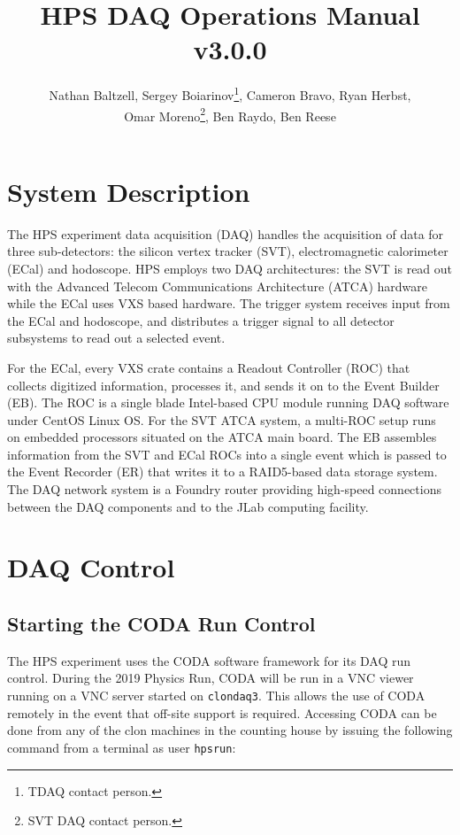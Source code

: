 \documentclass[12pt]{article}
\title{HPS DAQ Operations Manual v3.0.0}
\author{Nathan Baltzell, Sergey Boiarinov\thanks{TDAQ contact person.},
        Cameron Bravo, Ryan Herbst, \\ Omar Moreno\thanks{SVT DAQ contact person.}, 
        Ben Raydo, Ben Reese}
\begin{document}
\maketitle

\tableofcontents

\newpage
\section{System Description}
The HPS experiment data acquisition (DAQ) handles the acquisition of data for
three sub-detectors: the silicon vertex tracker (SVT), electromagnetic calorimeter
(ECal) and hodoscope. HPS employs two DAQ architectures: the SVT is read out 
with the Advanced Telecom Communications Architecture (ATCA) hardware while the
ECal uses VXS based hardware. The trigger system receives input from the ECal
and hodoscope, and distributes a trigger signal to all detector subsystems to
read out a selected event. 

For the ECal, every VXS crate contains a Readout Controller (ROC) that collects digitized information, processes it, and sends it on to the Event Builder (EB). The ROC is a single blade Intel-based CPU module running DAQ software under CentOS Linux OS. For the SVT ATCA system, a multi-ROC setup runs on embedded processors situated on the ATCA main board. The EB assembles information from the SVT and ECal ROCs into a single event which is passed to the Event Recorder (ER) that writes it to a RAID5-based data storage system. The DAQ network system is a Foundry router providing high-speed connections between the DAQ components and to the JLab computing facility. 

\newpage
\section{DAQ Control}
\label{sec:daq_control}

\subsection{Starting the CODA Run Control}\label{sec:daqstart}

The HPS experiment uses the CODA software framework for its DAQ run control. 
During the 2019 Physics Run, CODA will be run in a VNC viewer running on a 
VNC server started on \texttt{clondaq3}.  This allows the use of CODA remotely
in the event that off-site support is required.  Accessing CODA can be done 
from any of the clon machines in the counting house by issuing the following
command from a terminal as user \texttt{hpsrun}: \newline
\end{document}
